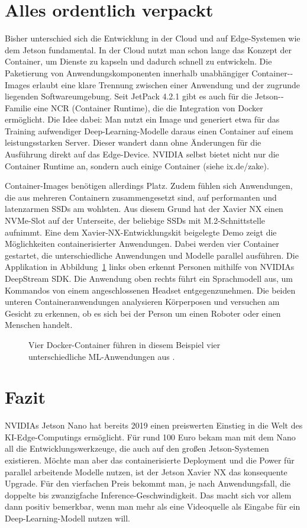\section{Alles ordentlich verpackt}
	Bisher unterschied sich die Entwicklung in der Cloud und auf Edge-Systemen wie dem Jetson fundamental. In der Cloud nutzt man schon lange das Konzept der Container, um Dienste zu kapseln und dadurch schnell zu entwickeln. Die Paketierung von Anwendungskomponenten innerhalb unabhängiger Container-­Images erlaubt eine klare Trennung zwischen einer Anwendung und der zugrunde liegenden Softwareumgebung. Seit JetPack 4.2.1 gibt es auch für die Jetson-­Familie eine NCR (Container Runtime), die die Integration von Docker ermöglicht. Die Idee dabei: Man nutzt ein Image und generiert etwa für das Training aufwendiger Deep-­Learning-Modelle da­raus einen Container auf einem leistungs­starken Server. Dieser wandert dann ohne Änderungen für die Ausführung direkt auf das Edge-Device. NVIDIA selbst bietet nicht nur die Container Runtime an, sondern auch einige Container (siehe ix.de/zake). 
	
	Container-Images benötigen allerdings Platz. Zudem fühlen sich Anwendungen, die aus mehreren Containern zusammengesetzt sind, auf performanten und latenzarmen SSDs am wohlsten. Aus diesem Grund hat der Xavier NX einen NVMe-Slot auf der Unterseite, der beliebige SSDs mit M.2-Schnittstelle aufnimmt. Eine dem Xavier-NX-Entwicklungskit beigelegte Demo zeigt die Möglichkeiten containerisierter Anwendungen. Dabei werden vier Container gestartet, die unterschiedliche Anwendungen und Modelle parallel ausführen. Die Applikation in Abbildung~\ref{XavierNXContainerDemo} links oben erkennt Personen mithilfe von NVIDIAs DeepStream SDK. Die Anwendung oben rechts führt ein Sprachmodell aus, um Kommandos von einem angeschlossenen Headset entgegenzunehmen. Die beiden unteren Containeranwendungen analysieren Körperposen und versuchen am Gesicht zu erkennen, ob es sich bei der Person um einen Roboter oder einen Menschen handelt. 
	
	
\begin{figure}
	
	\caption{Vier Docker-Container führen in diesem Beispiel vier unterschiedliche ML-Anwendungen aus .} \label{XavierNXContainerDemo}
	
\end{figure}

\section{Fazit }
	NVIDIAs Jetson Nano hat bereits 2019 einen preiswerten Einstieg in die Welt des KI-Edge-Computings ermöglicht. Für rund 100 Euro bekam man mit dem Nano all die Entwicklungswerkzeuge, die auch auf den großen Jetson-Systemen existieren. Möchte man aber das containerisierte Deployment und die Power für parallel arbeitende Modelle nutzen, ist der Jetson Xavier NX das konsequente Upgrade. Für den vierfachen Preis bekommt man, je nach Anwendungsfall, die doppelte bis zwanzigfache Inference-Geschwindigkeit. Das macht sich vor allem dann positiv bemerkbar, wenn man mehr als eine Videoquelle als Eingabe für ein Deep-Learning-­Modell nutzen will.
	

